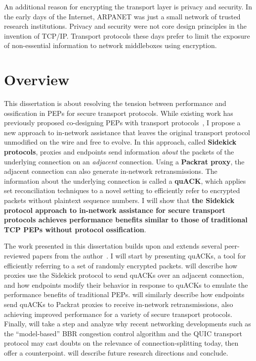An additional reason for encrypting the transport layer is privacy and security.
In the early days of the Internet, ARPANET was just a small network of trusted
research institutions. Privacy and security were not core design principles in
the invention of TCP/IP. Transport protocols these days prefer to limit the
exposure of non-essential information to network middleboxes using encryption.

\section{Overview}

This dissertation is about resolving the tension between performance and
ossification in PEPs for secure transport protocols. While existing work has
previously proposed co-designing PEPs with transport protocols~\cite{ford2008logjam,sherry2015blindbox, dogar2012tapa,iyengar2009flow},
I propose a new
approach to in-network assistance that leaves the original transport protocol
unmodified on the wire and free to evolve. In this approach, called \textbf
{Sidekick protocols}, proxies and endpoints send information \textit{about} the
packets of the underlying connection on an \textit{adjacent} connection.
Using a \textbf{Packrat proxy}, the adjacent connection can also generate
in-network retransmissions.
The information about the underlying connection is called a \textbf
{quACK}, which applies set reconciliation techniques to a novel setting to
efficiently refer to encrypted packets without plaintext sequence numbers.
I will show that \textcolor{black!50!blue}{\textbf{the Sidekick protocol
approach to in-network assistance for secure transport protocols achieves
performance benefits similar to those of traditional TCP PEPs without protocol
ossification}}.

The work presented in this dissertation builds upon and extends several
peer-reviewed papers from the author~\cite{yuan2022sidecar,yuan2024sidekick,yuan2025internet}.
I will start  by presenting quACKs, a tool for efficiently
referring to a set of randomly encrypted packets.
 will describe how proxies use the Sidekick protocol to send
quACKs over an adjacent connection, and how endpoints modify their behavior in
response to quACKs to emulate the performance benefits of traditional
PEPs.
 will similarly describe how endpoints send quACKs to Packrat
proxies to receive in-network retransmissions, also achieving improved
performance for a variety of secure transport protocols.
Finally,  will take a step and analyze why recent networking
developments such as the ``model-based'' BBR congestion control algorithm and
the QUIC transport protocol may cast doubts on the relevance of
connection-splitting today, then offer a counterpoint.
 will describe future research directions and conclude.

